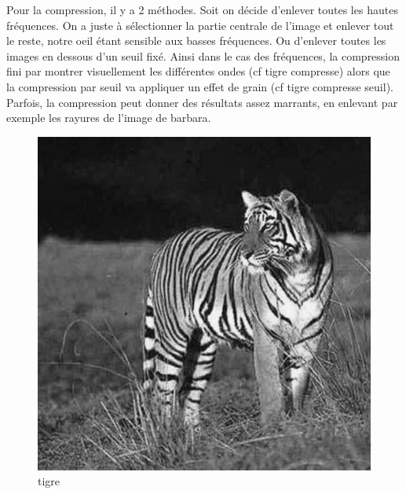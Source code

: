 \documentclass{article}
\begin{document}
Pour la compression, il y a 2 méthodes. Soit on décide d'enlever toutes les hautes fréquences. On a juste à sélectionner la partie centrale de l'image et enlever tout le reste, notre oeil étant sensible aux basses fréquences. Ou d'enlever toutes les images en dessous d'un seuil fixé. Ainsi dans le cas des fréquences, la compression fini par montrer visuellement les différentes ondes (cf tigre compresse) alors que la compression par seuil va appliquer un effet de grain (cf tigre compresse seuil). Parfois, la compression peut donner des résultats assez marrants, en enlevant par exemple les rayures de l'image de barbara.
\begin{figure}
	\begin{center}
		\includegraphics[scale=0.4]{tigre_512}\\
		tigre
	\end{center}
\end{figure}
\end{document}
